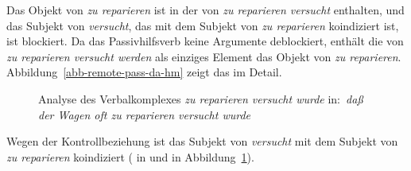 {\noindent
Das Objekt von \emph{zu reparieren} ist in der \subcatl von \emph{zu reparieren versucht} enthalten,
und das Subjekt von \emph{versucht}, das mit dem Subjekt von \emph{zu reparieren} koindiziert ist, ist blockiert.
Da das Passivhilfsverb keine Argumente deblockiert, enthält die \subcatl von \emph{zu reparieren versucht werden}
als einziges Element das Objekt von \emph{zu reparieren}.
Abbildung~\vref{abb-remote-pass-da-hm} zeigt das im Detail.
\begin{figure}
\caption{Analyse des Verbalkomplexes \emph{zu reparieren versucht wurde} in:\ \emph{daß der Wagen oft zu reparieren versucht wurde}}\label{abb-remote-pass-da-hm}
\end{figure}
Wegen der Kontrollbeziehung ist das Subjekt von \emph{versucht} mit dem Subjekt von \emph{zu reparieren} koindiziert (
in  und  in Abbildung~\ref{abb-remote-pass-da-hm}).
}
